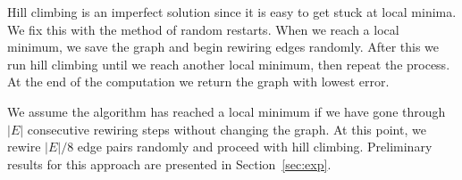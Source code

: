 Hill climbing is an imperfect solution since it is easy to get stuck at
local minima.  We fix this with the method of random restarts.  When we
reach a local minimum, we save the graph and begin rewiring edges randomly.
After this we run hill climbing until we reach another local minimum, then 
repeat the process.  At the end of the computation we return the graph with
lowest error.

We assume the algorithm has reached a local minimum if we have gone through
$|E|$ consecutive rewiring steps without changing the graph.  At this
point, we rewire $|E|/8$ edge pairs randomly and proceed with hill
climbing.  Preliminary results for this approach are presented in 
Section~\ref{sec:exp}.
